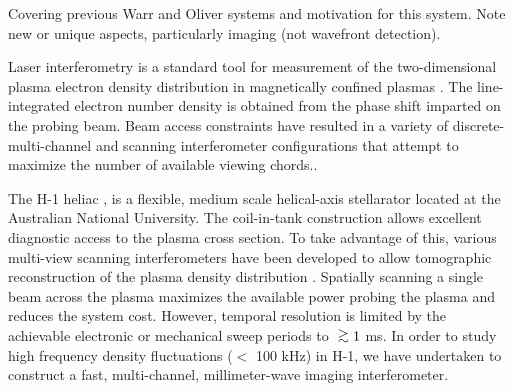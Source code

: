 \thispagestyle{empty}
Covering previous Warr\cite{WARR1998}\cite{WARR1997} and Oliver\cite{HOWARD2006}\cite{OLIVER2006} systems and motivation for this system.
Note new or unique aspects, particularly imaging (not wavefront detection).

Laser interferometry is a standard tool for measurement of the two-dimensional plasma electron density distribution in magnetically confined plasmas \cite{DONNE1995, HARTFUSS1997}.
The line-integrated electron number density is obtained from the phase shift imparted on the probing beam.
Beam access constraints have resulted in a variety of discrete-multi-channel and scanning interferometer configurations that attempt to maximize the number of available viewing chords.\cite{KAWAHATA1997,JIANG1995,ROMMERS1997,CANTON2006}.

The H-1 heliac \cite{HAMBERGER1990}, is a flexible, medium scale helical-axis stellarator located at the Australian National University.
The coil-in-tank construction allows excellent diagnostic access to the plasma cross section.
To take advantage of this, various multi-view scanning interferometers have been developed to allow tomographic reconstruction of the plasma density distribution \cite{WARR1997,HOWARD1992:2,HOWARD2006}.
Spatially scanning a single beam across the plasma maximizes the available power probing the plasma and reduces the system cost.
However, temporal resolution is limited by the achievable electronic or mechanical sweep periods to $\gsimeq 1$ ms.
In order to study high frequency density fluctuations ($<$ 100 kHz) in H-1, we have undertaken to construct a fast, multi-channel, millimeter-wave imaging interferometer.
